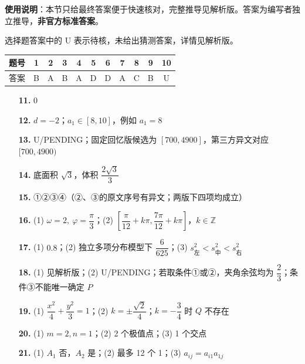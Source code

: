
\begin{gknotice}
\textbf{使用说明}：本节只给最终答案便于快速核对，完整推导见解析版。答案为编写者独立推导，\textbf{非官方标准答案}。
\end{gknotice}

\begin{gknotice}
选择题答案中的 U 表示待核，未给出猜测答案，详情见解析版。
\end{gknotice}

\begin{center}\begin{tabular}{ccccccccccc}
\toprule
题号 & 1 & 2 & 3 & 4 & 5 & 6 & 7 & 8 & 9 & 10 \\
\midrule
答案 & B & A & B & A & D & D & A & C & B & U \\
\bottomrule
\end{tabular}\end{center}

\begin{itemize}[leftmargin=2.6em]
  \item[\textbf{11.}] \(0\)
  \item[\textbf{12.}] \(d=-2\)；\(a_1\in[8,10]\)，例如 \(a_1=8\)
  \item[\textbf{13.}] U/PENDING；固定回忆版候选为 \([700,4900]\)，第三方异文对应 \([700,4900)\)
  \item[\textbf{14.}] 底面积 \(\sqrt3\)，体积 \(\dfrac{2\sqrt3}{3}\)
  \item[\textbf{15.}] ①②③④（②、③的原文序号有异文；两版下四项均成立）
\end{itemize}

\begin{itemize}[leftmargin=2.6em]
  \item[\textbf{16.}] (1) \(\omega=2,\ \varphi=\dfrac\pi3\)；(2) \(\left[\dfrac\pi{12}+k\pi,\dfrac{7\pi}{12}+k\pi\right]\)，\(k\in\mathbb{Z}\)
  \item[\textbf{17.}] (1) \(0.8\)；(2) 独立多项分布模型下 \(\dfrac6{625}\)；(3) \(s_{\text{左}}^2<s_{\text{中}}^2<s_{\text{右}}^2\)
  \item[\textbf{18.}] (1) 见解析版；(2) U/PENDING；若取条件①或②，夹角余弦均为 \(\dfrac23\)；条件③不能唯一确定 \(P\)
  \item[\textbf{19.}] (1) \(\dfrac{x^2}{4}+\dfrac{y^2}{3}=1\)；(2) \(k=\pm\dfrac{\sqrt2}{4}\)；\(k=-\dfrac34\) 时 \(Q\) 不存在
  \item[\textbf{20.}] (1) \(m=2,n=1\)；(2) 2 个极值点；(3) 1 个交点
  \item[\textbf{21.}] (1) \(A_1\) 否，\(A_2\) 是；(2) 最多 12 个 1；(3) \(a_{ij}=a_{i1}a_{1j}\)
\end{itemize}
